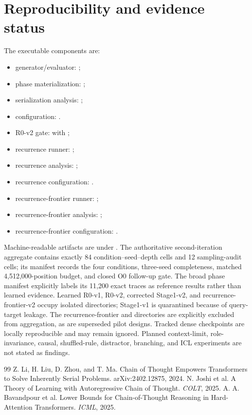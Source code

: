 \documentclass[10pt]{article}
\begin{document}
\section{Reproducibility and evidence status}
The executable components are:
\begin{itemize}
\item generator/evaluator: ;
\item phase materialization: ;
\item serialization analysis: ;
\item configuration: .
\item R0-v2 gate:  with ;
\item recurrence runner: ;
\item recurrence analysis: ;
\item recurrence configuration: .
\item recurrence-frontier runner: ;
\item recurrence-frontier analysis: ;
\item recurrence-frontier configuration: .
\end{itemize}
Machine-readable artifacts are under . The authoritative second-iteration aggregate contains exactly 84 condition--seed--depth cells and 12 sampling-audit cells; its manifest records the four conditions, three-seed completeness, matched 4,512,000-position budget, and closed O0 follow-up gate. The broad phase manifest explicitly labels its 11,200 exact traces as reference results rather than learned evidence. Learned R0-v1, R0-v2, corrected Stage1-v2, and recurrence-frontier-v2 occupy isolated directories; Stage1-v1 is quarantined because of query-target leakage. The recurrence-frontier  and  directories are explicitly excluded from aggregation, as are superseded pilot designs. Tracked dense checkpoints are locally reproducible and may remain ignored. Planned context-limit, role-invariance, causal, shuffled-rule, distractor, branching, and ICL experiments are not stated as findings.

\begin{thebibliography}{99}
 Z. Li, H. Liu, D. Zhou, and T. Ma. Chain of Thought Empowers Transformers to Solve Inherently Serial Problems. arXiv:2402.12875, 2024.
 N. Joshi et al. A Theory of Learning with Autoregressive Chain of Thought. \emph{COLT}, 2025.
 A. A. Bavandpour et al. Lower Bounds for Chain-of-Thought Reasoning in Hard-Attention Transformers. \emph{ICML}, 2025.
\end{thebibliography}
\end{document}
